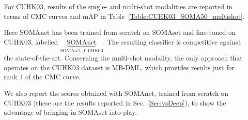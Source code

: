 \documentclass[10pt,journal,letterpaper,compsoc]{IEEEtran}
\newcommand{\ts}[2]{$\underbrace{\text{#1}}_\text{#2}$}
\begin{document}
For CUHK03, results of the single- and multi-shot modalities are reported in terms of CMC curves and mAP in Table~\ref{Table:CUHK03_SOMA50_multishot}.

Here SOMAnet has been trained from scratch on SOMAset and fine-tuned on CUHK03, labelled
\ts{SOMAnet}{SOMAset+CUHK03}. The resulting classifier is competitive against the state-of-the-art. Concerning the multi-shot modality, the only approach that operates on the CUHK03 dataset is MB-DML, which provides    results just for rank 1 of the CMC curve.

We also report the scores obtained with SOMAnet, trained from scratch on CUHK03 (these are the results reported in Sec.~\ref{Sec:vsDeep}), to show the advantage of bringing in SOMAset into play. 


\begin{table}[!htbp]
\scriptsize
	\centering
	\caption{Analysis of the performance of SOMAnet against other methodologies when trained on SOMAset,  fine-tuned on the training partition of the CUHK03 dataset, and tested on the test partition of the CUHK03 dataset, in both \emph{single-shot} and \emph{multi-shot} modalities.}
\end{table}
\end{document}
